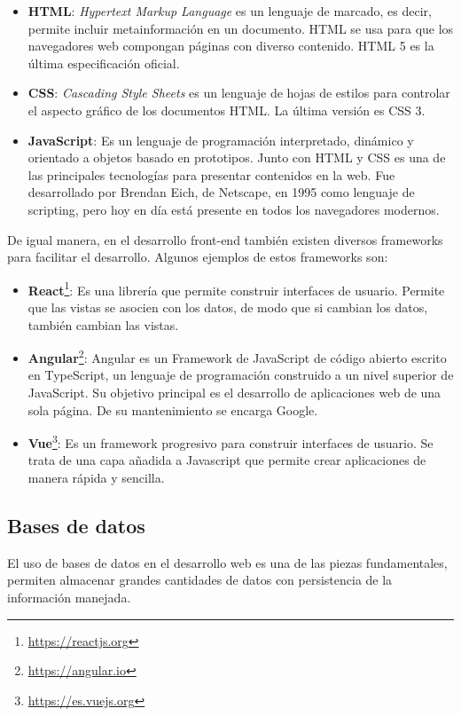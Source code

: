 \documentclass[a4paper, 12pt, oneside]{book}
\begin{document}
\begin{itemize}
\item \textbf{HTML}: \textit{Hypertext Markup Language} es un lenguaje de marcado, es decir, permite incluir metainformación en un documento. HTML se usa para que los navegadores web compongan páginas con diverso contenido. HTML 5 es la última especificación oficial.

\item \textbf{CSS}: \textit{Cascading Style Sheets} es un lenguaje de hojas de estilos para controlar el aspecto gráfico de los documentos HTML. La última versión es CSS 3.

\item \textbf{JavaScript}: Es un lenguaje de programación interpretado, dinámico y orientado a objetos basado en prototipos. Junto con HTML y CSS es una de las principales tecnologías para presentar contenidos en la web. Fue desarrollado por Brendan Eich, de Netscape, en 1995 como lenguaje de scripting, pero hoy en día está presente en todos los navegadores modernos.
\end{itemize}

De igual manera, en el desarrollo front-end también existen diversos frameworks para facilitar el desarrollo. Algunos ejemplos de estos frameworks son:

\begin{itemize}
\item \textbf{React}\footnote{\url{https://reactjs.org}}: Es una librería que permite construir interfaces de usuario. Permite que las vistas se asocien con los datos, de modo que si cambian los datos, también cambian las vistas.

\item \textbf{Angular}\footnote{\url{https://angular.io}}: Angular es un Framework de JavaScript de código abierto escrito en TypeScript, un lenguaje de programación construido a un nivel superior de JavaScript. Su objetivo principal es el desarrollo de aplicaciones web de una sola página. De su mantenimiento se encarga Google.

\item \textbf{Vue}\footnote{\url{https://es.vuejs.org}}: Es un framework progresivo para construir interfaces de usuario. Se trata de una capa añadida a Javascript que permite crear aplicaciones de manera rápida y sencilla.
\end{itemize}

\subsection{Bases de datos}
\label{subsec: bases de datos}
El uso de bases de datos en el desarrollo web es una de las piezas fundamentales, permiten almacenar grandes cantidades de datos con persistencia de la información manejada.
\end{document}
